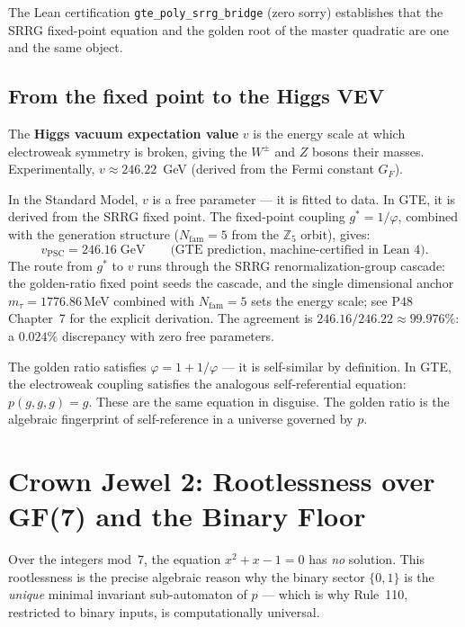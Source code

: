 \documentclass[11pt,a4paper]{article}
\newcommand{\term}[1]{\textbf{#1}}
\newcommand{\Nfam}{N_{\mathrm{fam}}}
\newcommand{\lean}[1]{\texttt{#1}}
\begin{document}
The Lean certification \lean{gte\_poly\_srrg\_bridge} (zero sorry) establishes
that the SRRG fixed-point equation and the golden root of the master quadratic
are one and the same object.

\subsection{From the fixed point to the Higgs VEV}

The \term{Higgs vacuum expectation value} $v$ is the energy scale at which
electroweak symmetry is broken, giving the $W^\pm$ and $Z$ bosons their masses.
Experimentally, $v \approx 246.22$~GeV (derived from the Fermi constant $G_F$).

In the Standard Model, $v$ is a free parameter — it is fitted to data.  In GTE,
it is derived from the SRRG fixed point.  The fixed-point coupling
$g^* = 1/\varphi$, combined with the generation structure
($\Nfam = 5$ from the $\mathbb{Z}_5$ orbit), gives:
\[
  v_{\mathrm{PSC}} = 246.16\;\mathrm{GeV}
  \qquad \text{(GTE prediction, machine-certified in Lean~4)}.
\]
The route from $g^*$ to $v$ runs through the SRRG renormalization-group cascade:
the golden-ratio fixed point seeds the cascade, and the single dimensional anchor
$m_\tau = 1776.86$\,MeV combined with $\Nfam = 5$ sets the energy scale;
see P48 Chapter~7 for the explicit derivation.
The agreement is $246.16/246.22 \approx 99.976\%$: a $0.024\%$ discrepancy
with zero free parameters.

\begin{tcolorbox}[colback=boxgold,colframe=orange!70!black,
  title=Why the golden ratio?]
The golden ratio satisfies $\varphi = 1 + 1/\varphi$ — it is self-similar by
definition.  In GTE, the electroweak coupling satisfies the analogous
self-referential equation: $p(g,g,g) = g$.  These are the same equation in
disguise.  The golden ratio is the algebraic fingerprint of self-reference
in a universe governed by $p$.
\end{tcolorbox}

\section{Crown Jewel 2: Rootlessness over GF(7) and the Binary Floor}
\label{sec:gf7}

\begin{tcolorbox}[colback=boxpurple,colframe=blue!50!black,
  title=Crown Jewel 2 — over $\mathrm{GF}(7)$]
Over the integers mod~7, the equation $x^2 + x - 1 = 0$ has \emph{no} solution.
This rootlessness is the precise algebraic reason why the binary sector
$\{0,1\}$ is the \emph{unique} minimal invariant sub-automaton of $p$ — which
is why Rule~110, restricted to binary inputs, is computationally universal.
\end{tcolorbox}
\end{document}
